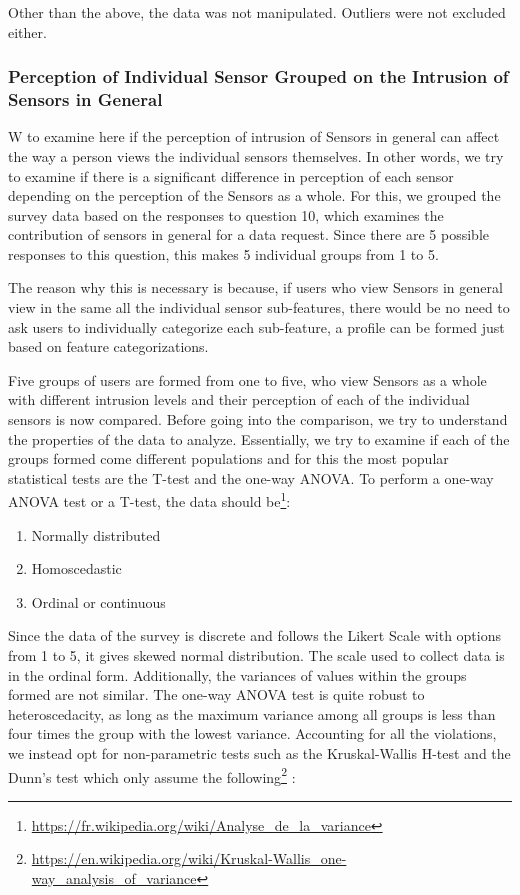 Other than the above, the data was not manipulated. Outliers were not excluded either.

\subsubsection{Perception of Individual Sensor Grouped on the Intrusion of Sensors in General} \label{result:sensor}
W to examine here if the perception of intrusion of Sensors in general can affect the way a person views the individual sensors themselves. In other
words, we try to examine if there is a significant difference in perception of each sensor depending on the perception of the Sensors as a whole.
For this, we grouped the survey data based on the responses to question 10, which examines the contribution of sensors in general for a data request. Since there are 5 possible responses to this question, this makes 5 individual groups from 1 to 5.

The reason why this is necessary is because, if users who view Sensors in general view in the same all the individual sensor sub-features, there would be no need to ask users to individually categorize each sub-feature, a profile can be formed just based on feature categorizations.

Five groups of users are formed from one to five, who view Sensors as a whole with different intrusion levels and their perception of each of the individual sensors is now compared. Before going into the comparison, we try to understand the properties of the data to analyze. Essentially, we try to examine if each of the groups formed come different populations and for this the most popular statistical tests are the T-test and the one-way ANOVA. To perform a one-way ANOVA test or a T-test, the data should be\footnote{\url{https://fr.wikipedia.org/wiki/Analyse\_de\_la\_variance}}:

\begin{enumerate}
\item Normally distributed
\item Homoscedastic
\item Ordinal or continuous
\end{enumerate}

Since the data of the survey is discrete and follows the Likert Scale with options from 1 to 5, it gives skewed normal distribution. The scale used to collect data is in the ordinal form. Additionally, the variances of values within the groups formed are not similar. The one-way ANOVA test is quite robust to heteroscedacity, as long as the maximum variance among all groups is less than four times the group with the lowest variance.  Accounting for all the violations, we instead opt for non-parametric tests such as the Kruskal-Wallis H-test and the Dunn's test
which only assume the following\footnote{\url{https://en.wikipedia.org/wiki/Kruskal-Wallis\_one-way\_analysis\_of\_variance}} : 

